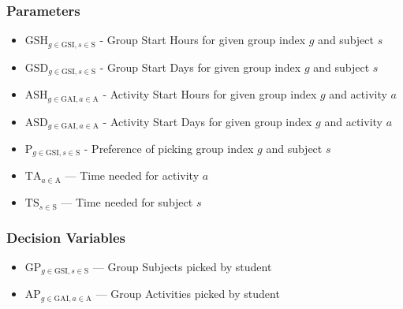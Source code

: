 \subsubsection*{Parameters}
\begin{itemize}
    \item $\textrm{GSH}_{g \in \textrm{GSI}, s \in \textrm{S}}$ - Group Start Hours for given group index $g$ and subject $s$
    \item $\textrm{GSD}_{g \in \textrm{GSI}, s \in \textrm{S}}$ - Group Start Days for given group index $g$ and subject $s$
    \item $\textrm{ASH}_{g \in \textrm{GAI}, a \in \textrm{A}}$ - Activity Start Hours for given group index $g$ and activity $a$
    \item $\textrm{ASD}_{g \in \textrm{GAI}, a \in \textrm{A}}$ - Activity Start Days for given group index $g$ and activity $a$
    \item $\textrm{P}_{g \in \textrm{GSI}, s \in \textrm{S}}$ - Preference of picking group index $g$ and subject $s$
    \item $\textrm{TA}_{a \in \textrm{A}}$ --- Time needed for activity $a$
    \item $\textrm{TS}_{s \in \textrm{S}}$ --- Time needed for subject $s$
\end{itemize}
\subsubsection*{Decision Variables}
\begin{itemize}
    \item $\textrm{GP}_{g \in \textrm{GSI}, s \in \textrm{S}}$ --- Group Subjects picked by student
    \item $\textrm{AP}_{g \in \textrm{GAI}, a \in \textrm{A}}$ --- Group Activities picked by student
\end{itemize}
